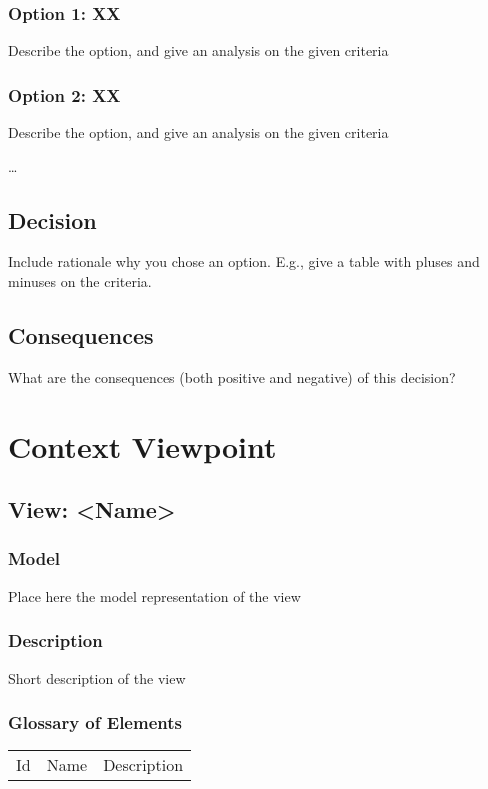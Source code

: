 \documentclass{article}
\begin{document}
\subsubsection*{Option 1: XX}
Describe the option, and give an analysis on the given criteria

\subsubsection*{Option 2: XX}
Describe the option, and give an analysis on the given criteria

\ldots

\subsection*{Decision}
Include rationale why you chose an option. E.g., give a table with pluses and minuses on the criteria.

\subsection*{Consequences}
What are the consequences (both positive and negative) of this decision?

\section*{Context Viewpoint}
\subsection*{View: \textless{}Name\textgreater{}}
\subsubsection*{Model}
Place here the model representation of the view

\subsubsection*{Description}
Short description of the view

\subsubsection*{Glossary of Elements}
\begin{longtable}{lll}
Id & Name & Description \\
\end{longtable}
\end{document}

